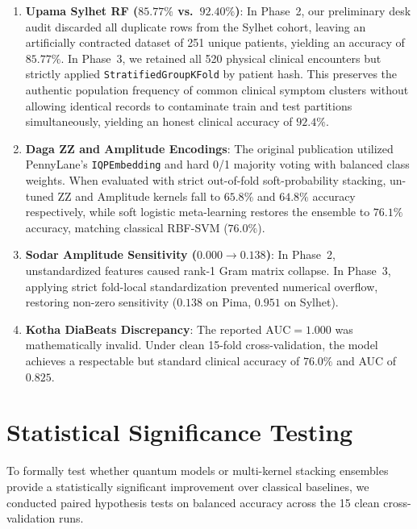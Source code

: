 \documentclass[journal,twocolumn]{IEEEtran}
\begin{document}
\begin{enumerate}
    \item \textbf{Upama Sylhet RF ($85.77\%$ vs.\ $92.40\%$)}: In Phase~2, our preliminary desk audit discarded all duplicate rows from the Sylhet cohort, leaving an artificially contracted dataset of 251 unique patients, yielding an accuracy of $85.77\%$. In Phase~3, we retained all 520 physical clinical encounters but strictly applied \texttt{StratifiedGroupKFold} by patient hash. This preserves the authentic population frequency of common clinical symptom clusters without allowing identical records to contaminate train and test partitions simultaneously, yielding an honest clinical accuracy of $92.4\%$.
    \item \textbf{Daga ZZ and Amplitude Encodings}: The original publication utilized PennyLane's \texttt{IQPEmbedding} and hard 0/1 majority voting with balanced class weights. When evaluated with strict out-of-fold soft-probability stacking, un-tuned ZZ and Amplitude kernels fall to $65.8\%$ and $64.8\%$ accuracy respectively, while soft logistic meta-learning restores the ensemble to $76.1\%$ accuracy, matching classical RBF-SVM ($76.0\%$).
    \item \textbf{Sodar Amplitude Sensitivity ($0.000 \to 0.138$)}: In Phase~2, unstandardized features caused rank-1 Gram matrix collapse. In Phase~3, applying strict fold-local standardization prevented numerical overflow, restoring non-zero sensitivity ($0.138$ on Pima, $0.951$ on Sylhet).
    \item \textbf{Kotha DiaBeats Discrepancy}: The reported $\text{AUC} = 1.000$ was mathematically invalid. Under clean 15-fold cross-validation, the model achieves a respectable but standard clinical accuracy of $76.0\%$ and AUC of $0.825$.
\end{enumerate}

\section{Statistical Significance Testing}
\label{sec:stats}

To formally test whether quantum models or multi-kernel stacking ensembles provide a statistically significant improvement over classical baselines, we conducted paired hypothesis tests on balanced accuracy across the 15 clean cross-validation runs.
\end{document}
